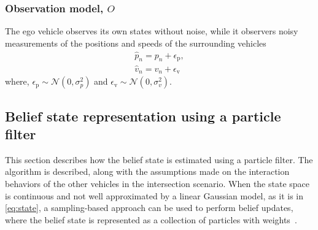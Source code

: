 \subsubsection{Observation model, $O$}

The ego vehicle observes its own states without noise, 
while it observers noisy measurements of the positions and speeds of the surrounding vehicles 
\begin{align}
    \label{eq:noise_pos}
    \hat{p}_{n} = p_{n} + \epsilon_\mathrm{p},\\ 
    \hat{v}_n = v_n + \epsilon_\mathrm{v}
    \label{eq:noise_vel}
\end{align}
where, $\epsilon_\mathrm{p} \sim \mathcal{N}(0, \sigma^2_p)$ and $\epsilon_\mathrm{v} \sim \mathcal{N}(0, \sigma^2_v)$. 



\subsection{Belief state representation using a particle filter}
\label{sec:particle_filter}
This section describes how the belief state is estimated using a particle filter. The algorithm is described, along with the assumptions made on the interaction behaviors of the other vehicles in the intersection scenario. 
When the state space is continuous and not well approximated by a linear Gaussian model, as it is in \eqref{eq:state}, a sampling-based approach can be used to perform belief updates, where the belief state is represented as a collection of particles with weights~\cite{Kochenderfer2015}. 

